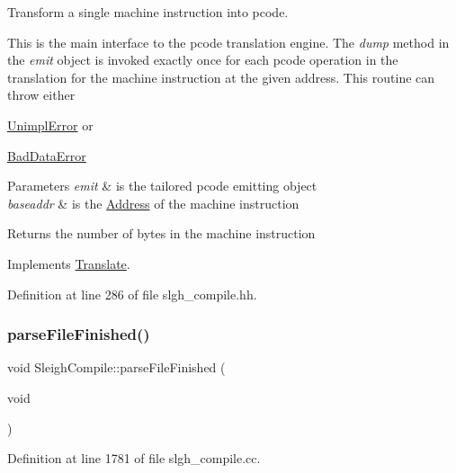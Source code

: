 Transform a single machine instruction into pcode. 

This is the main interface to the pcode translation engine. The {\itshape dump} method in the {\itshape emit} object is invoked exactly once for each pcode operation in the translation for the machine instruction at the given address. This routine can throw either
\begin{DoxyItemize}
\item \mbox{\hyperlink{struct_unimpl_error}{Unimpl\+Error}} or
\item \mbox{\hyperlink{struct_bad_data_error}{Bad\+Data\+Error}}
\end{DoxyItemize}


\begin{DoxyParams}{Parameters}
{\em emit} & is the tailored pcode emitting object \\
\hline
{\em baseaddr} & is the \mbox{\hyperlink{class_address}{Address}} of the machine instruction \\
\hline
\end{DoxyParams}
\begin{DoxyReturn}{Returns}
the number of bytes in the machine instruction 
\end{DoxyReturn}


Implements \mbox{\hyperlink{class_translate_a1737782c38ee43de62ae2e7572321fc9}{Translate}}.



Definition at line 286 of file slgh\+\_\+compile.\+hh.

\mbox{\label{class_sleigh_compile_a70eb25a26cb9e8f0b4e8ef44511c3f78}} 
\subsubsection{\texorpdfstring{parseFileFinished()}{parseFileFinished()}}
{\footnotesize\ttfamily void Sleigh\+Compile\+::parse\+File\+Finished (\begin{DoxyParamCaption}\item[{void}]{ }\end{DoxyParamCaption})}



Definition at line 1781 of file slgh\+\_\+compile.\+cc.

\mbox{\label{class_sleigh_compile_aaf7be52d56942f5de10d908e00826d22}} 
